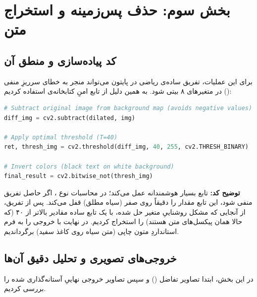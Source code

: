 \section{بخش سوم: حذف پس‌زمینه و استخراج متن}

\begin{stepbox}
\end{stepbox}

\subsection{کد پیاده‌سازی و منطق آن}
برای این عملیات، تفریق ساده‌ی ریاضی در پایتون می‌تواند منجر به خطای سرریزِ منفی () در متغیرهای ۸ بیتی شود. به همین دلیل از تابع امنِ کتابخانه‌ی  استفاده کردیم:

\begin{codebox}
\begin{lstlisting}[language=Python]
# Subtract original image from background map (avoids negative values)
diff_img = cv2.subtract(dilated, img)

# Apply optimal threshold (T=40)
ret, thresh_img = cv2.threshold(diff_img, 40, 255, cv2.THRESH_BINARY)

# Invert colors (black text on white background)
final_result = cv2.bitwise_not(thresh_img)
\end{lstlisting}
\end{codebox}

\textbf{توضیح کد:}
تابع  بسیار هوشمندانه عمل می‌کند؛ در محاسبات نوع ، اگر حاصل تفریق منفی شود، این تابع مقدار را دقیقاً روی صفر (سیاه مطلق) قفل می‌کند. پس از تفریق، از آنجایی که مشکل روشناییِ متغیر حل شده، با یک تابع  ساده مقادیر بالاتر از ۴۰ (که حالا همان پیکسل‌های متن هستند) را استخراج کردیم. در نهایت با  خروجی را به فرم استانداردِ متون چاپی (متن سیاه روی کاغذ سفید) برگرداندیم.

\subsection{خروجی‌های تصویری و تحلیل دقیق آن‌ها}
در این بخش، ابتدا تصاویر تفاضل () و سپس تصاویر خروجی نهاییِ آستانه‌گذاری شده را بررسی کردیم.

